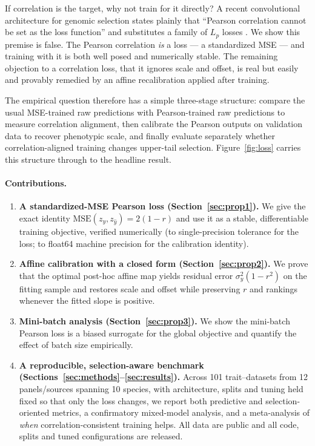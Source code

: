 \documentclass[11pt]{article}
\newcommand{\NUM}[1]{#1} %
\theoremstyle{plain}
\theoremstyle{remark}
\begin{document}
If correlation is the target, why not train for it directly? A recent
convolutional architecture for genomic selection states plainly that ``Pearson
correlation cannot be set as the loss function'' and substitutes a family of
$L_p$ losses \citep{pnngs2024}. We show this premise is false. The Pearson
correlation \emph{is} a loss --- a standardized MSE --- and training with it is
both well posed and numerically stable. The remaining objection to a correlation
loss, that it ignores scale and offset, is real but easily and provably remedied
by an affine recalibration applied after training.

The empirical question therefore has a simple three-stage structure: compare
the usual MSE-trained raw predictions with Pearson-trained raw predictions to
measure correlation alignment, then calibrate the Pearson outputs on validation
data to recover phenotypic scale, and finally evaluate separately whether
correlation-aligned training changes upper-tail selection. Figure~\ref{fig:loss}
carries this structure through to the headline result.

\paragraph{Contributions.}
\begin{enumerate}
\item \textbf{A standardized-MSE Pearson loss (Section~\ref{sec:prop1}).} We give
the exact identity $\mathrm{MSE}(z_y,z_{\hat y}) = 2(1-r)$ and use it as a stable,
differentiable training objective, verified numerically (to single-precision
tolerance for the loss; to float64 machine precision for the calibration identity).
\item \textbf{Affine calibration with a closed form
(Section~\ref{sec:prop2}).} We prove that the optimal post-hoc affine map yields
residual error $\sigma_y^2(1-r^2)$ on the fitting sample and restores scale and
offset while preserving $r$ and rankings whenever the fitted slope is positive.
\item \textbf{Mini-batch analysis (Section~\ref{sec:prop3}).} We show the
mini-batch Pearson loss is a biased surrogate for the global objective and
quantify the effect of batch size empirically.
\item \textbf{A reproducible, selection-aware benchmark
(Sections~\ref{sec:methods}--\ref{sec:results}).} Across \NUM{101}
trait--datasets from \NUM{12} panels/sources spanning 10 species, with architecture, splits and tuning held
fixed so that only the loss changes, we report both predictive and
selection-oriented metrics, a confirmatory mixed-model analysis, and a
meta-analysis of \emph{when} correlation-consistent training helps. All data are
public and all code, splits and tuned configurations are released.
\end{enumerate}
\end{document}
